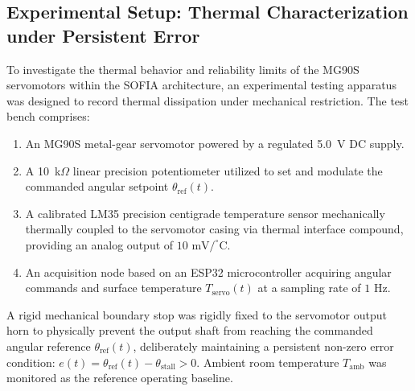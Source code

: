 \documentclass[lettersize,journal]{IEEEtran}
\begin{document}
	\subsection{Experimental Setup: Thermal Characterization under Persistent Error}
	\label{sec:thermal_experiment}
	
	To investigate the thermal behavior and reliability limits of the MG90S servomotors within the SOFIA architecture, an experimental testing apparatus was designed to record thermal dissipation under mechanical restriction. The test bench comprises:
	\begin{enumerate}
		\item {}An MG90S metal-gear servomotor powered by a regulated 5.0~V DC supply.
		\item A 10~k$\Omega$ linear precision potentiometer utilized to set and modulate the commanded angular setpoint $\theta_{\text{ref}}(t)$.
		\item {}A calibrated LM35 precision centigrade temperature sensor mechanically thermally coupled to the servomotor casing via thermal interface compound, providing an analog output of $10\text{ mV}/^\circ\text{C}$.
		\item {}An acquisition node based on an ESP32 microcontroller acquiring angular commands and surface temperature $T_{\text{servo}}(t)$ at a sampling rate of $1\text{ Hz}$.
	\end{enumerate}
	
	A rigid mechanical boundary stop was rigidly fixed to the servomotor output horn to physically prevent the output shaft from reaching the commanded angular reference $\theta_{\text{ref}}(t)$, deliberately maintaining a persistent non-zero error condition: $e(t) = \theta_{\text{ref}}(t) - \theta_{\text{stall}} > 0$. Ambient room temperature $T_{\text{amb}}$ was monitored as the reference operating baseline.
	
\end{document}
